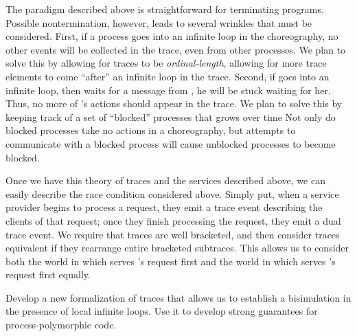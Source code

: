 The paradigm described above is straightforward for terminating programs.
Possible nontermination, however, leads to several wrinkles that must be considered.
First, if a process goes into an infinite loop in the choreography, no other events will be collected in the trace, even from other processes.
We plan to solve this by allowing for traces to be \emph{ordinal-length}, allowing for more trace elements to come ``after'' an infinite loop in the trace.
Second, if \Alice{} goes into an infinite loop, then \Bob{} waits for a message from \Alice, he will be stuck waiting for her.
Thus, no more of \Bob{}'s actions should appear in the trace.
We plan to solve this by keeping track of a set of ``blocked'' processes that grows over time
Not only do blocked processes take no actions in a choreography, but attempts to communicate with a blocked process will cause unblocked processes to become blocked.

Once we have this theory of traces and the services described above, we can easily describe the race condition considered above.
Simply put, when a service provider begins to process a request, they emit a trace event describing the clients of that request; once they finish processing the request, they emit a dual trace event.
We require that traces are well bracketed, and then consider traces equivalent if they rearrange entire bracketed subtraces.
This allows us to consider both the world in which \Alice{} serves \Bob{}'s request first and the world in which \Alice{} serves \Cathy{}'s request first equally.

\begin{goal}
  \label{goal:strong-epp}
  Develop a new formalization of traces that allows us to establish a bisimulation in the presence of local infinite loops.
  Use it to develop strong guarantees for process-polymorphic code.
\end{goal}
\fi


